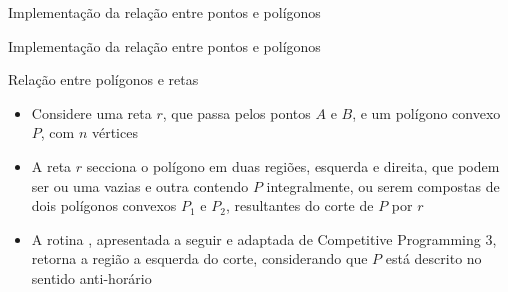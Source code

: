 \begin{frame}[fragile]{Implementação da relação entre pontos e polígonos}
\end{frame}

\begin{frame}[fragile]{Implementação da relação entre pontos e polígonos}
\end{frame}

\begin{frame}[fragile]{Relação entre polígonos e retas}

    \begin{itemize}
        \item Considere uma reta $r$, que passa pelos pontos $A$ e $B$, e um polígono convexo $P$, 
            com $n$ vértices

        \item A reta $r$ secciona o polígono em duas regiões, esquerda e direita, que podem ser ou 
            uma vazias e outra contendo $P$ integralmente, ou serem compostas de dois polígonos 
            convexos $P_1$ e $P_2$, resultantes do corte de $P$ por $r$

        \item A rotina , apresentada a seguir e adaptada de Competitive 
            Programming 3, retorna a região a esquerda do corte, considerando que $P$ está descrito 
            no sentido anti-horário
    \end{itemize}

    \begin{figure}
        \centering

    \end{figure}

\end{frame}

